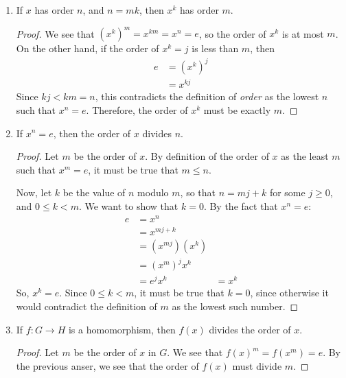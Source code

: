\documentclass[12pt]{article}
\theoremstyle{definition}
\newenvironment{problem}[2][Problem]{\begin{trivlist}
\item[\hskip \labelsep {\bfseries #1}\hskip \labelsep {\bfseries #2.}]}{\end{trivlist}}
\begin{document}
\begin{problem}{2}
\begin{enumerate}[label=(\alph*)]
    \item If $x$ has order $n$, and $n = mk$, then $x^k$ has order $m$.
    \begin{proof}
    We see that $(x^k)^m = x^{km} = x^n = e$, so the order of $x^k$ is at most $m$. On the other hand, if the order of $x^k = j$ is less than $m$, then
    \begin{align*}
        e &= (x^k)^j\\
        &= x^{kj}
    \end{align*}
    Since $kj < km = n$, this contradicts the definition of \textit{order} as the lowest $n$ such that $x^n = e$. Therefore, the order of $x^k$ must be exactly $m$.
    \end{proof}
    \item If $x^n = e$, then the order of $x$ divides $n$.
    \begin{proof}
    Let $m$ be the order of $x$. By definition of the order of $x$ as the least $m$ such that $x^m = e$, it must be true that $m \leq n$. 
    \par Now, let $k$ be the value of $n$ modulo $m$, so that $n = mj + k$ for some $j \geq 0$, and $0 \leq k < m$. We want to show that $k=0$. By the fact that $x^n = e$:
    \begin{align*}
        e &= x^n\\
        &= x^{mj + k}\\
        &= (x^{mj})(x^k)\\
        &= (x^m)^jx^k\\
        &= e^jx^k
        &= x^k
    \end{align*}
    So, $x^k = e$. Since $0 \leq k < m$, it must be true that $k = 0$, since otherwise it would contradict the definition of $m$ as the lowest such number.
    \end{proof}
    \item If $f : G \to H$ is a homomorphism, then $f(x)$ divides the order of $x$.
    \begin{proof}
    Let $m$ be the order of $x$ in $G$. We see that $f(x)^m = f(x^m) = e$. By the previous anser, we see that the order of $f(x)$ must divide $m$.
    \end{proof}
    \end{enumerate}
\end{problem}
\end{document}
